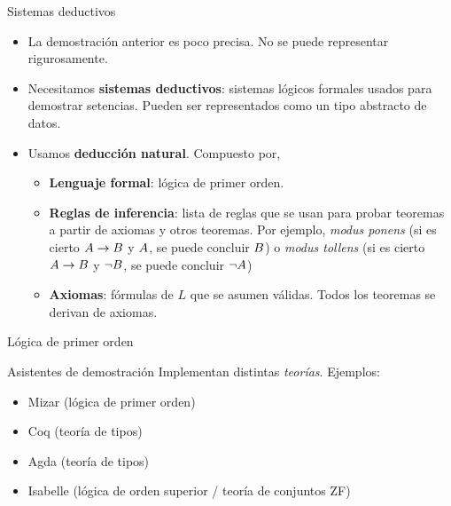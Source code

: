 \documentclass{beamer}
\begin{document}
\begin{frame}{Sistemas deductivos}
    \begin{itemize}
        \item La demostración anterior es poco precisa. No se puede representar rigurosamente.
        \item Necesitamos \textbf{sistemas deductivos}: sistemas lógicos formales usados para demostrar setencias. Pueden ser representados como un tipo abstracto de datos.
        \item Usamos \textbf{deducción natural}. Compuesto por,
        \begin{itemize}
            \item \textbf{Lenguaje formal}: lógica de primer orden.
            \item \textbf{Reglas de inferencia}: lista de reglas que se usan para probar teoremas a partir de axiomas y otros teoremas. Por ejemplo, \textit{modus ponens} (si
    es cierto $A \to B$ y $A$, se puede concluir $B$) o
    \textit{modus tollens} (si es cierto $A \to B$ y $\neg
    B$, se puede concluir $\neg A$)
    \item \textbf{Axiomas}: fórmulas de $L$ que se asumen válidas. Todos los
    teoremas se derivan de axiomas.
        \end{itemize}
    \end{itemize}
\end{frame}

\begin{frame}{Lógica de primer orden}
    
\end{frame}

\begin{frame}{Asistentes de demostración}
    Implementan distintas \textit{teorías}.
    Ejemplos:
    \begin{itemize}
        \item Mizar (lógica de primer orden)
        \item Coq (teoría de tipos)
        \item Agda (teoría de tipos)
        \item Isabelle (lógica de orden superior / teoría de conjuntos ZF)
    \end{itemize}
\end{frame}
\end{document}
